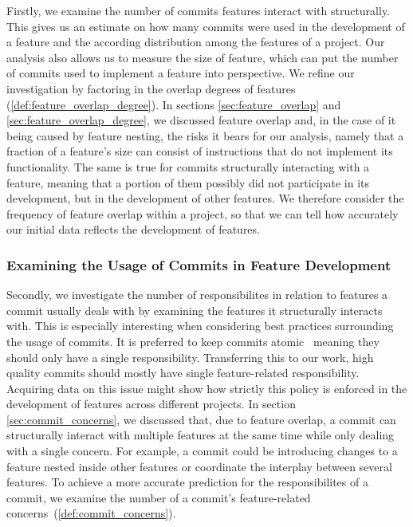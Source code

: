 Firstly, we examine the number of commits features interact with structurally. 
This gives us an estimate on how many commits were used in the development of a feature and the according distribution among the features of a project.
Our analysis also allows us to measure the size of feature, which can put the number of commits used to implement a feature into perspective.
We refine our investigation by factoring in the overlap degrees of features (\ref{def:feature_overlap_degree}). 
In sections \ref{sec:feature_overlap} and \ref{sec:feature_overlap_degree}, we discussed feature overlap and, in the case of it being caused by feature nesting, the risks it bears for our analysis, namely that a fraction of a feature's size can consist of instructions that do not implement its functionality.
The same is true for commits structurally interacting with a feature, meaning that a portion of them possibly did not participate in its development, but in the development of other features.
We therefore consider the frequency of feature overlap within a project, so that we can tell how accurately our initial data reflects the development of features.

\subsubsection*{Examining the Usage of Commits in Feature Development}

Secondly, we investigate the number of responsibilites in relation to features a commit usually deals with by examining the features it structurally interacts with. 
This is especially interesting when considering best practices surrounding the usage of commits.
It is preferred to keep commits atomic~\cite{hundhausen2021commit_metrics} meaning they should only have a single responsibility.
Transferring this to our work, high quality commits should mostly have single feature-related responsibility.
Acquiring data on this issue might show how strictly this policy is enforced in the development of features across different projects. 
In section \ref{sec:commit_concerns}, we discussed that, due to feature overlap, a commit can structurally interact with multiple features at the same time while only dealing with a single concern.
For example, a commit could be introducing changes to a feature nested inside other features or coordinate the interplay between several features.
To achieve a more accurate prediction for the responsibilites of a commit, we examine the number of a commit's feature-related concerns~(\ref{def:commit_concerns}).

